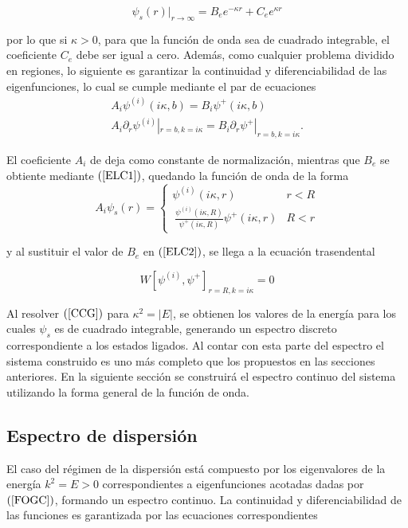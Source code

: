 \begin{equation}
\psi_s(r)|_{r \to \infty} = B_e e^{-\kappa r} + C_e e^{\kappa r}
\end{equation}

por lo que si $\kappa > 0$, para que la función de onda sea de cuadrado integrable, el coeficiente $C_e$ debe ser igual a cero. Además, como cualquier problema dividido en regiones, lo siguiente es garantizar la continuidad y diferenciabilidad de las eigenfunciones, lo cual se cumple mediante el par de ecuaciones
\begin{eqnarray}
A_i \psi^{(i)}(i\kappa,b)= B_i \psi^{+}(i\kappa,b) \\[0.3cm]\label{ELC1}
A_i \partial_r \psi^{(i)}|_{r=b,k=i\kappa}= B_i \partial_r\psi^{+} |_{r=b,k=i\kappa} \label{ELC2}.
\end{eqnarray} 

El coeficiente $A_i$ de deja como constante de normalización, mientras que $B_e$ se obtiente mediante $(\ref{ELC1})$, quedando la función de onda de la forma
\begin{equation*}
A_i
\psi_s(r)=\begin{cases}
\psi^{(i)}(i \kappa,r) & r < R
\\\ \frac{\psi^{(i)}(i \kappa,R)}{\psi^{+}(i \kappa,R)} \psi^{+}(i \kappa,r) & R < r
\end{cases}
\end{equation*}

 y al sustituir el valor de $B_e$ en $(\ref{ELC2})$, se llega a la ecuación trasendental

\begin{equation}
W[\psi^{(i)},\psi^{+}]_{r=R, k = i \kappa}=0 \label{CCG}
\end{equation}


Al resolver $(\ref{CCG})$ para $\kappa^2 = |E|$, se obtienen los valores de la energía para los cuales $\psi_s$ es de cuadrado integrable, generando un espectro discreto correspondiente a los estados ligados. Al contar con esta parte del espectro el sistema construido es uno más completo que los propuestos en las secciones anteriores. En la siguiente sección se construirá el espectro continuo del sistema utilizando la forma general de la función de onda.


\subsection{Espectro de dispersión}


El caso del régimen de la dispersión está compuesto por los eigenvalores de la energía $k^2 = E >0$ correspondientes a eigenfunciones acotadas dadas por $(\ref{FOGC})$, formando un espectro continuo. La continuidad y diferenciabilidad de las funciones es garantizada por las ecuaciones correspondientes


